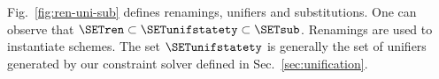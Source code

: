 \documentclass{jfp1}
\begin{document}
Fig.~\ref{fig:ren-uni-sub} defines renamings, unifiers and
substitutions.
%
One can observe that
$\SETren\subset\SETunifstatety\subset\SETsub$.
%
Renamings are used to instantiate schemes.
%
%
The set
$\SETunifstatety$ is generally the set of unifiers generated by our
constraint solver defined in Sec.~\ref{sec:unification}.
%
\end{document}
